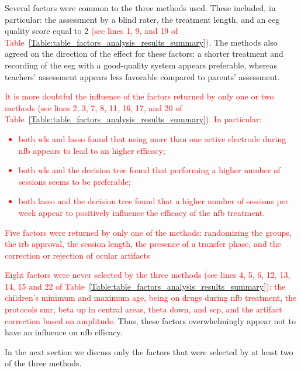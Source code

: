Several factors were common to the three methods used. These included, in particular: the assessment 
by a blind rater, the treatment length, and an \gls{eeg} quality score equal to 2 \textcolor{red}{(see lines 1, 9, and 19 of 
Table~\ref{Table:table_factors_analysis_results_summary})}.
The methods also agreed on the direction of the effect for these factors: 
a shorter treatment and recording of the \gls{eeg} with a good-quality system appears preferable, whereas teachers' assessment appears less favorable 
compared to parents' assessment.

\textcolor{red}{It is more doubtful the influence of the factors returned by only one or two methods (see lines 2, 3, 7, 8, 11, 16, 17, and 20
of Table~\ref{Table:table_factors_analysis_results_summary}). In particular: 
\begin{itemize}
\item both \gls{wls} and \gls{lasso} found that using more than one active electrode during \gls{nfb} appears to lead to an higher efficacy;
\item both \gls{wls} and the decision tree found that performing a higher number of sessions seems to be preferable;
\item both \gls{lasso} and the decision tree found that a higher number of sessions per week appear to positively influence the efficacy of the \gls{nfb} treatment.
\end{itemize}
Five factors were returned by only one of the methods: randomizing the groups, the \gls{irb} approval, the session length, the presence of a transfer phase, 
and the correction or rejection of ocular artifacts}

\textcolor{red}{Eight factors were never selected by the three methods (see lines 4, 5, 6, 12, 13, 14, 15 and 22 of 
Table~\ref{Table:table_factors_analysis_results_summary}): the children's minimum and maximum age, being on drugs during \gls{nfb} treatment,
the protocols \gls{smr}, beta up in central areas, theta down, and \gls{scp}, and the artifact correction based on amplitude.}
Thus, these factors overwhelmingly appear not to have an influence on \gls{nfb} efficacy. 

In the next section we discuss only the factors that were selected by at least two of the three methods. 

